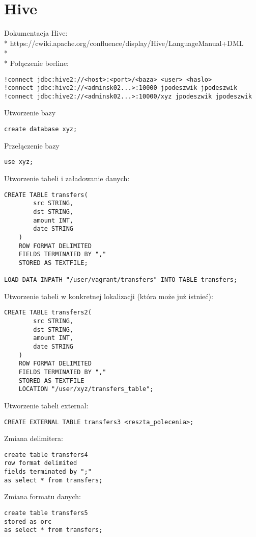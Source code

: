 \documentclass{article}
\begin{document}
\section*{Hive}

Dokumentacja Hive:
\\*
https://cwiki.apache.org/confluence/display/Hive/LanguageManual+DML
\\*
\\*
Połączenie beeline:
\begin{lstlisting}
!connect jdbc:hive2://<host>:<port>/<baza> <user> <haslo>
!connect jdbc:hive2://<adminsk02...>:10000 jpodeszwik jpodeszwik
!connect jdbc:hive2://<adminsk02...>:10000/xyz jpodeszwik jpodeszwik
\end{lstlisting}

Utworzenie bazy
\begin{lstlisting}
create database xyz;
\end{lstlisting}

Przełączenie bazy
\begin{lstlisting}
use xyz;
\end{lstlisting}

Utworzenie tabeli i załadowanie danych:
\begin{lstlisting}
CREATE TABLE transfers(
		src STRING,
		dst STRING,
		amount INT,
		date STRING
	)
	ROW FORMAT DELIMITED
	FIELDS TERMINATED BY ","
	STORED AS TEXTFILE;

LOAD DATA INPATH "/user/vagrant/transfers" INTO TABLE transfers;
\end{lstlisting}

Utworzenie tabeli w konkretnej lokalizacji (która może już istnieć):
\begin{lstlisting}
CREATE TABLE transfers2(
		src STRING,
		dst STRING,
		amount INT,
		date STRING
	)
	ROW FORMAT DELIMITED
	FIELDS TERMINATED BY ","
	STORED AS TEXTFILE
	LOCATION "/user/xyz/transfers_table";
\end{lstlisting}

Utworzenie tabeli external:
\begin{lstlisting}
CREATE EXTERNAL TABLE transfers3 <reszta_polecenia>;
\end{lstlisting}

Zmiana delimitera:
\begin{lstlisting}
create table transfers4
row format delimited
fields terminated by ";"
as select * from transfers;
\end{lstlisting}

Zmiana formatu danych:
\begin{lstlisting}
create table transfers5
stored as orc
as select * from transfers;
\end{lstlisting}
\end{document}
